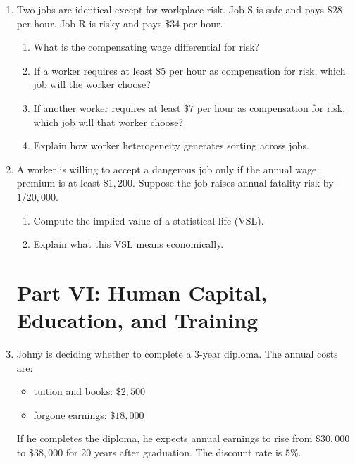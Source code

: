 \documentclass[12pt]{article}
\begin{document}
\begin{enumerate}
\section*{Part V: Compensating Wage Differentials}

\item Two jobs are identical except for workplace risk. Job S is safe and pays \(\$28\) per hour. Job R is risky and pays \(\$34\) per hour.

\begin{enumerate}[label=(\alph*)]
    \item What is the compensating wage differential for risk?
    \item If a worker requires at least \(\$5\) per hour as compensation for risk, which job will the worker choose?
    \item If another worker requires at least \(\$7\) per hour as compensation for risk, which job will that worker choose?
    \item Explain how worker heterogeneity generates sorting across jobs.
\end{enumerate}

\item A worker is willing to accept a dangerous job only if the annual wage premium is at least \(\$1{,}200\). Suppose the job raises annual fatality risk by \(1/20{,}000\).

\begin{enumerate}[label=(\alph*)]
    \item Compute the implied value of a statistical life (VSL).
    \item Explain what this VSL means economically.
\end{enumerate}

\section*{Part VI: Human Capital, Education, and Training}

\item Johny is deciding whether to complete a 3-year diploma. The annual costs are:
\begin{itemize}
    \item tuition and books: \(\$2{,}500\)
    \item forgone earnings: \(\$18{,}000\)
\end{itemize}
If he completes the diploma, he expects annual earnings to rise from \(\$30{,}000\) to \(\$38{,}000\) for 20 years after graduation. The discount rate is \(5\%\).


\end{enumerate}
\end{document}
